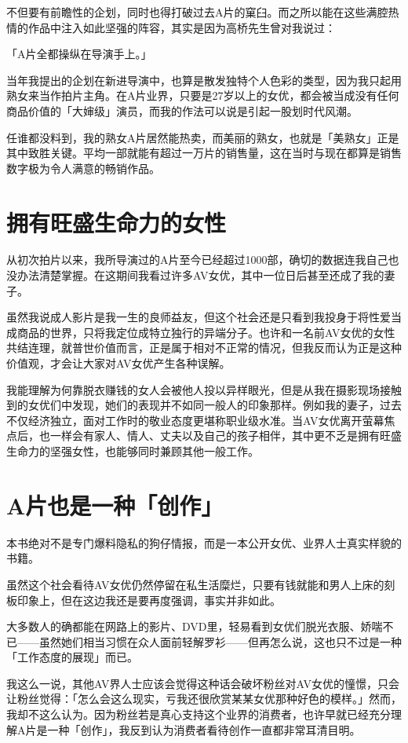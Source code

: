 \documentclass[12pt,UTF8]{ctexbook}
\begin{document}
不但要有前瞻性的企划，同时也得打破过去A片的窠臼。而之所以能在这些满腔热情的作品中注入如此坚强的阵容，其实是因为高桥先生曾对我说过：

「A片全都操纵在导演手上。」

当年我提出的企划在新进导演中，也算是散发独特个人色彩的类型，因为我只起用熟女来当作拍片主角。在A片业界，只要是27岁以上的女优，都会被当成没有任何商品价值的「大婶级」演员，而我的作法可以说是引起一股划时代风潮。

任谁都没料到，我的熟女A片居然能热卖，而美丽的熟女，也就是「美熟女」正是其中致胜关键。平均一部就能有超过一万片的销售量，这在当时与现在都算是销售数字极为令人满意的畅销作品。

\section{拥有旺盛生命力的女性}

从初次拍片以来，我所导演过的A片至今已经超过1000部，确切的数据连我自己也没办法清楚掌握。在这期间我看过许多AV女优，其中一位日后甚至还成了我的妻子。

虽然我说成人影片是我一生的良师益友，但这个社会还是只看到我投身于将性爱当成商品的世界，只将我定位成特立独行的异端分子。也许和一名前AV女优的女性共结连理，就普世价值而言，正是属于相对不正常的情况，但我反而认为正是这种价值观，才会让大家对AV女优产生各种误解。

我能理解为何靠脱衣赚钱的女人会被他人投以异样眼光，但是从我在摄影现场接触到的女优们中发现，她们的表现并不如同一般人的印象那样。例如我的妻子，过去不仅经济独立，面对工作时的敬业态度更堪称职业级水准。当AV女优离开萤幕焦点后，也一样会有家人、情人、丈夫以及自己的孩子相伴，其中更不乏是拥有旺盛生命力的坚强女性，也能够同时兼顾其他一般工作。

\section{A片也是一种「创作」}

本书绝对不是专门爆料隐私的狗仔情报，而是一本公开女优、业界人士真实样貌的书籍。

虽然这个社会看待AV女优仍然停留在私生活糜烂，只要有钱就能和男人上床的刻板印象上，但在这边我还是要再度强调，事实并非如此。

大多数人的确都能在网路上的影片、DVD里，轻易看到女优们脱光衣服、娇喘不已——虽然她们相当习惯在众人面前轻解罗衫——但再怎么说，这也只不过是一种「工作态度的展现」而已。

我这么一说，其他AV界人士应该会觉得这种话会破坏粉丝对AV女优的憧憬，只会让粉丝觉得：「怎么会这么现实，亏我还很欣赏某某女优那种好色的模样。」然而，我却不这么认为。因为粉丝若是真心支持这个业界的消费者，也许早就已经充分理解A片是一种「创作」，我反到认为消费者看待创作一直都非常耳清目明。
\end{document}
